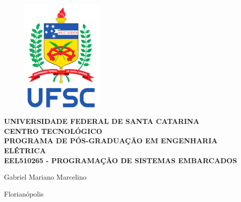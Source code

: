 %
%
%
%
%

%
%
%
%
%

\begin{titlepage}
    \thispagestyle{empty}

    \begin{figure}[!ht]
        \begin{center}
            \includegraphics[width=4cm]{figures/ufsc.pdf}
        \end{center}
    \end{figure}

    \begin{center}
        \large{\textbf{UNIVERSIDADE FEDERAL DE SANTA CATARINA}} \\
        \large{\textbf{CENTRO TECNOLÓGICO}} \\
        \large{\textbf{PROGRAMA DE PÓS-GRADUAÇÃO EM ENGENHARIA ELÉTRICA}} \\
        \large{\textbf{EEL510265 - PROGRAMAÇÃO DE SISTEMAS EMBARCADOS}} \\
    \end{center}

    \vfill
    \vfill

    \begin{center}
        \textbf{\textit{\thetitle}}
    \end{center}

    \vfill
    \vfill

    \begin{center}
        \large{Gabriel Mariano Marcelino}
    \end{center}

    \vspace{1cm}

    \begin{center}
        Florianópolis

        \the\year
    \end{center}
\end{titlepage}
